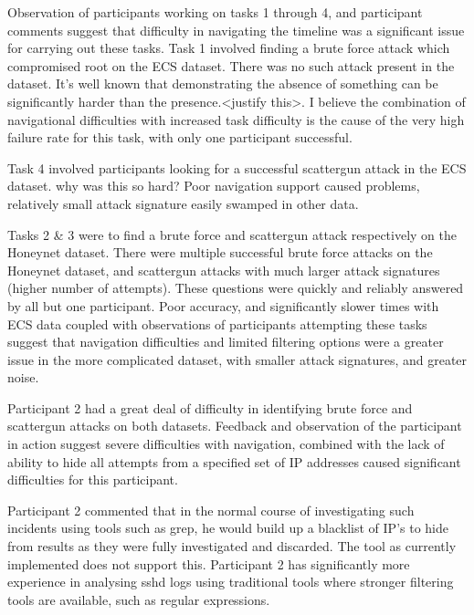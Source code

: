 Observation of participants working on tasks 1 through 4, and participant comments suggest that difficulty in navigating the timeline was a significant issue for carrying out these tasks.
Task 1 involved finding a brute force attack which compromised root on the ECS dataset. There was no such attack present in the dataset. It's well known that demonstrating the absence of something can be significantly harder than the presence.<justify this>. I believe the combination of navigational difficulties with increased task difficulty is the cause of the very high failure rate for this task, with only one participant successful.

Task 4 involved participants looking for a successful scattergun attack in the ECS dataset. why was this so hard? Poor navigation support caused problems, relatively small attack signature easily swamped in other data.

Tasks 2 \& 3 were to find a brute force and scattergun attack respectively on the Honeynet dataset.
There were multiple successful brute force attacks on the Honeynet dataset, and scattergun attacks with much larger attack signatures (higher number of attempts). These questions were quickly and reliably answered by all but one participant. Poor accuracy, and significantly slower times with ECS data coupled with observations of participants attempting these tasks suggest that navigation difficulties and limited filtering options were a greater issue in the more complicated dataset, with smaller attack signatures, and greater noise. 

Participant 2 had a great deal of difficulty in identifying brute force and scattergun attacks on both datasets. Feedback and observation of the participant in action suggest severe difficulties with navigation, combined with the lack of ability to hide all attempts from a specified set of IP addresses caused significant difficulties for this participant.

Participant 2 commented that in the normal course of investigating such incidents using tools such as grep, he would build up a blacklist of IP's to hide from results as they were fully investigated and discarded.
The tool as currently implemented does not support this. Participant 2 has significantly more experience in analysing sshd logs using traditional tools where stronger filtering tools are available, such as regular expressions. 

